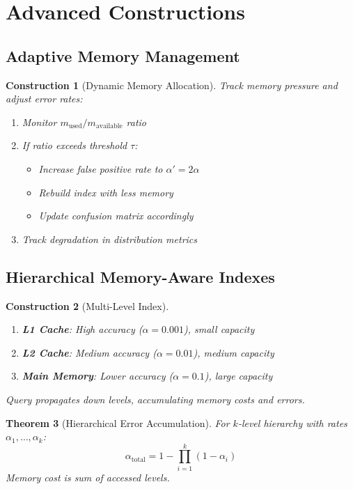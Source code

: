 \documentclass[11pt,final]{article}
\newtheorem{theorem}{Theorem}[section]
\newtheorem{construction}[theorem]{Construction}
\begin{document}
\section{Advanced Constructions}

\subsection{Adaptive Memory Management}

\begin{construction}[Dynamic Memory Allocation]
Track memory pressure and adjust error rates:
\begin{enumerate}
    \item Monitor $m_{\text{used}}/m_{\text{available}}$ ratio
    \item If ratio exceeds threshold $\tau$:
        \begin{itemize}
            \item Increase false positive rate to $\alpha' = 2\alpha$
            \item Rebuild index with less memory
            \item Update confusion matrix accordingly
        \end{itemize}
    \item Track degradation in distribution metrics
\end{enumerate}
\end{construction}

\subsection{Hierarchical Memory-Aware Indexes}

\begin{construction}[Multi-Level Index]
\begin{enumerate}
    \item \textbf{L1 Cache}: High accuracy ($\alpha = 0.001$), small capacity
    \item \textbf{L2 Cache}: Medium accuracy ($\alpha = 0.01$), medium capacity  
    \item \textbf{Main Memory}: Lower accuracy ($\alpha = 0.1$), large capacity
\end{enumerate}
Query propagates down levels, accumulating memory costs and errors.
\end{construction}

\begin{theorem}[Hierarchical Error Accumulation]
For $k$-level hierarchy with rates $\alpha_1, \ldots, \alpha_k$:
\begin{equation}
\alpha_{\text{total}} = 1 - \prod_{i=1}^k (1 - \alpha_i)
\end{equation}
Memory cost is sum of accessed levels.
\end{theorem}
\end{document}
